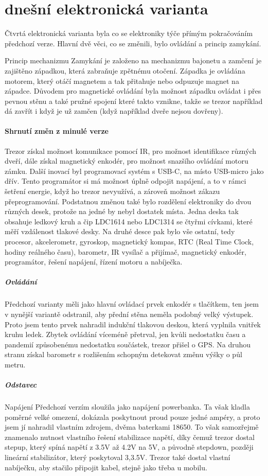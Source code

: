\section*{dnešní elektronická varianta}

Čtvrtá elektronická varianta byla co se elektroniky týče přímým pokračováním předchozí verze. Hlavní dvě věci, co se změnili, bylo ovládání 
a princip zamykání. 

Princip mechanizmu
Zamykání je založeno na mechanizmu bajonetu a zamčení je zajištěno západkou, která zabraňuje zpětnému otočení.
Západka je ovládána motorem, který otáčí magnetem a tak přitahuje nebo odpuzuje magnet na západce. Důvodem pro magnetické ovládání
byla možnost západku ovládat i přes pevnou stěnu a také pružné spojení které takto vznikne, takže se trezor například dá zavřít i když
je už zamčen (když například dveře nejsou dovřeny).

\paragraph{Shrnutí změn z minulé verze}
Trezor získal možnost komunikace pomocí IR, pro možnost identifikace různých dveří, dále získal magnetický enkodér, pro možnost snazšího ovládání
motoru zámku. 
Další inovací byl programovací systém s USB-C, na místo USB-micro jako dřív. Tento programátor si má možnost úplně odpojit napájení, a to v rámci šetření 
energie, když ho trezor nevyužívá, a zároveň možnost zákazu přeprogramování.
Podstatnou změnou také bylo rozdělení elektroniky do dvou různých desek, protože na jedné by nebyl dostatek místa. Jedna deska tak obsahuje ledkový 
kruh a čip LDC1614 nebo LDC1314 se čtyřmi cívkami, které měří vzdálenost tlakové desky. Na druhé desce pak bylo vše ostatní, tedy procesor, akcelerometr,
gyroskop, magnetický kompas, RTC (Real Time Clock, hodiny reálného času), barometr, IR vysílač a přijímač, magnetický enkodér, programátor, řešení 
napájení, řízení motoru a nabíječka.

\subparagraph{Ovládání}
Předchozí varianty měli jako hlavní ovládací prvek enkodér s tlačítkem, ten jsem v nynější variantě odstranil, aby přední stěna neměla podobný velký 
výstupek. Proto jsem tento prvek nahradil indukční tlakovou deskou, která vyplnila vnitřek kruhu ledek. 
Zbytek ovládání víceméně přetrval, jen kvůli nedostatku času a pandemií způsobenému nedostatku součástek, trezor přišel o GPS. Na druhou stranu 
získal barometr s rozlišením schopným detekovat změnu výšky o půl metru.

\subparagraph{Odstavec}Napájení
Předchozí verzím sloužila jako napájení powerbanka. Ta však kladla poměrné velké omezení, dokázala poskytnout proud pouze jedné ampéry, a proto 
jsem jí nahradil vlastním zdrojem, dvěma baterkami 18650. To však samozřejmě znamenalo nutnost vlastního řešení stabilizace napětí, díky čemuž 
trezor dostal stepup, který spíná napětí z 3.5V až 4.2V na 5V, a původně stepdown, později lineární stabilizátor, který poskytoval 3,3.5V.
Trezor také dostal vlastní nabíječku, aby stačilo připojit kabel, stejně jako třeba u mobilu.

\newpage